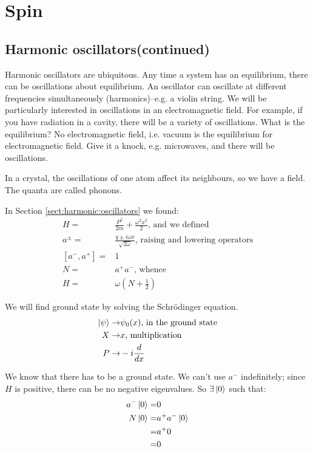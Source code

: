 \documentclass[]{article}
\begin{document}
\section{Spin}

\subsection{Harmonic oscillators(continued)}

Harmonic oscillators are ubiquitous. Any time a system has an equilibrium, there can be oscillations about equilibrium. An oscillator can oscillate at different frequencies simultaneously (harmonics)--e.g. a violin string. We will be particularly interested in oscillations in an electromagnetic field.  For example, if you have radiation in a cavity, there will be a variety of oscillations. What is the equilibrium? No electromagnetic field, i.e. vacuum is the equilibrium for electromagnetic field. Give it a knock, e.g. microwaves, and there will be oscillations.

In a crystal, the oscillations of one atom affect its neighbours, so we have a field. The quanta are called phonons.

In Section \ref{sect:harmonic:oscillators} we found:
\begin{align*}
	H =& \frac{P^2}{2m} + \frac{\omega^2 x^2}{2} \text{, and we defined}\\
	a^\pm=& \frac{q \pm i \omega x}{\sqrt{2 \omega}} \text{, raising and lowering operators}\\
	[a^-,a^+]=& 1\\
	N =& a^+a^- \text{, whence}\\
	H =& \omega(N+\frac{1}{2})
\end{align*}

We will find ground state by solving the Schr\"odinger equation.
\begin{align*}
	\ket{\psi} \rightarrow& \psi_0(x) \text{, in the ground state}\\
	X \rightarrow& x \text{, multiplication}\\
	P \rightarrow& -i \frac{d}{dx}
\end{align*}


We know that there has to be a ground state. We can't use $a^-$ indefinitely; since $H$ is positive, there can be no negative eigenvalues. So $\exists \ket{0}$ such that: 
\begin{align*}
	a^-\ket{0}=&0\\
	N\ket{0}=&a^+a^- \ket{0 }\\
	=& a^+0\\
	=&0
\end{align*}
\end{document}
